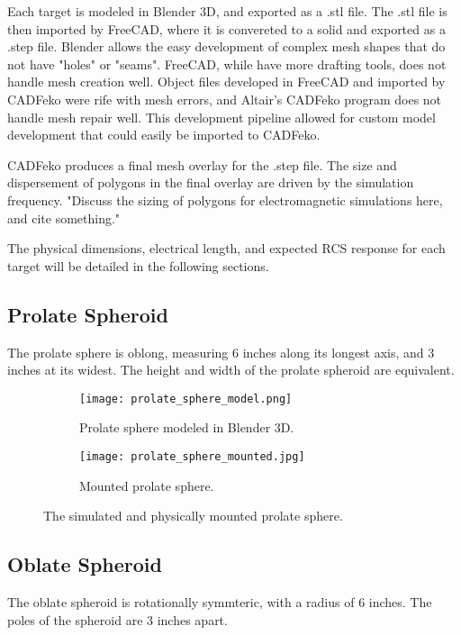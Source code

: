 Each target is modeled in Blender 3D, and exported as a .stl file. The .stl file is then imported by FreeCAD, where it is convereted to a solid and exported as a .step file. Blender allows the easy development of complex mesh shapes that do not have "holes" or "seams". FreeCAD, while have more drafting tools, does not handle mesh creation well. Object files developed in FreeCAD and imported by CADFeko were rife with mesh errors, and Altair's CADFeko program does not handle mesh repair well. This development pipeline allowed for custom model development that could easily be imported to CADFeko.

CADFeko produces a final mesh overlay for the .step file. The size and dispersement of polygons in the final overlay are driven by the simulation frequency. "Discuss the sizing of polygons for electromagnetic simulations here, and cite something."

The physical dimensions, electrical length, and expected RCS response for each target will be detailed in the following sections.

\subsection{Prolate Spheroid}

The prolate sphere is oblong, measuring 6 inches along its longest axis, and 3 inches at its widest. The height and width of the prolate spheroid are equivalent.

\begin{figure}[htbp]
\centering
\begin{subfigure}{.5\textwidth}
  \centering
  \texttt{[image: prolate\_sphere\_model.png]}
  \caption{Prolate sphere modeled in Blender 3D.}
  \label{fig:ps_model}
\end{subfigure}%
\begin{subfigure}{.5\textwidth}
  \centering
  \texttt{[image: prolate\_sphere\_mounted.jpg]}
  \caption{Mounted prolate sphere.}
  \label{fig:ps_mount}
\end{subfigure}
\caption{The simulated and physically mounted prolate sphere.}
\label{fig:ps}
\end{figure}

\subsection{Oblate Spheroid}

The oblate spheroid is rotationally symmteric, with a radius of 6 inches. The poles of the spheroid are 3 inches apart.

